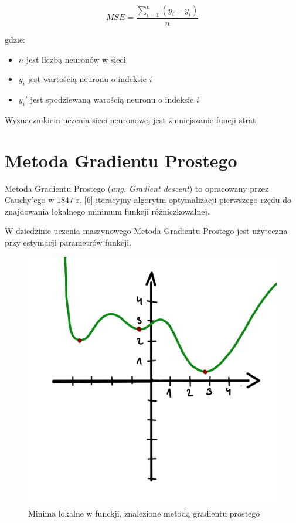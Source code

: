 \documentclass[brudnopis]{xmgr}
\begin{document}
$$MSE=\frac{\sum_{i=1}^{n} (y_i - y_i)}{n}$$

gdzie: 

\begin{itemize}
\item $n$ jest liczbą neuronów w sieci
\item $y_i$ jest wartością neuronu o indeksie $i$ 
\item $y_i'$ jest spodziewaną warością neuronu o indeksie $i$ 
\end{itemize}

Wyznacznikiem uczenia sieci neuronowej jest zmniejszanie funcji strat. 


 \section{Metoda Gradientu Prostego\label{s:dsssl}}

Metoda Gradientu Prostego (\textit{ang. Gradient descent}) to opracowany przez Cauchy'ego w 1847 r. [6] iteracyjny algorytm optymalizacji pierwszego rzędu do znajdowania lokalnego minimum funkcji różniczkowalnej.

W dziedzinie uczenia maszynowego Metoda Gradientu Prostego jest użyteczna przy estymacji parametrów funkcji. 


\begin{figure}[!tbh]
\centering
\includegraphics[width=.8\hsize]{fig/11}
\caption{Minima lokalne w funckji, znalezione metodą gradientu prostego\label{RYS.3}}
\end{figure}
\end{document}
